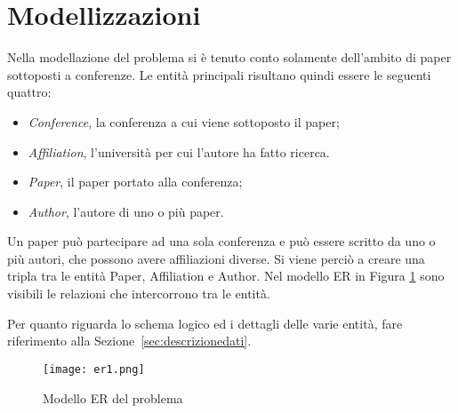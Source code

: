 \section{Modellizzazioni}\label{sec:modellizzazioni}

Nella modellazione del problema si è tenuto conto solamente dell'ambito di
paper sottoposti a conferenze. Le entità principali risultano quindi essere
le seguenti quattro:

\begin{itemize}
    \item \textit{Conference}, la conferenza a cui viene sottoposto il paper;
    \item \textit{Affiliation}, l'università per cui l'autore ha fatto ricerca. 
    \item \textit{Paper}, il paper portato alla conferenza;
    \item \textit{Author}, l'autore di uno o più paper. 
\end{itemize}

Un paper può partecipare ad una sola conferenza e può essere scritto da uno o
più autori, che possono avere affiliazioni diverse. Si viene perciò a
creare una tripla tra le entità Paper, Affiliation e Author.
Nel modello ER in Figura \ref{fig:er1} sono visibili le relazioni che
intercorrono tra le entità.

Per quanto riguarda lo schema logico ed i dettagli delle varie entità,
fare riferimento alla Sezione~\ref{sec:descrizionedati}.

\begin{figure}
    \centering
    \texttt{[image: er1.png]}
    \caption{Modello ER del problema}
    \label{fig:er1}
\end{figure}

